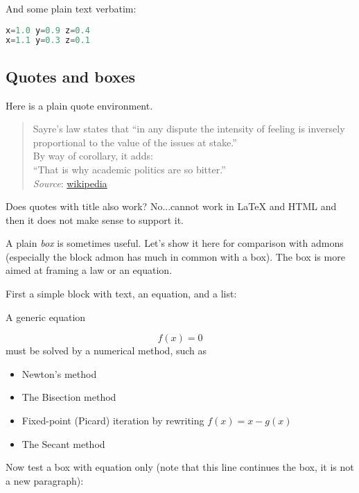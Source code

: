 \documentclass[%
oneside,                 %
final,                   %
10pt]{article}
\begin{document}
And some plain text verbatim:

\begin{lstlisting}[language=Python,style=simple,xleftmargin=2mm]
x=1.0 y=0.9 z=0.4
x=1.1 y=0.3 z=0.1
\end{lstlisting}

\subsection{Quotes and boxes}

Here is a plain quote environment.


\begin{quote}
Sayre's law states that
``in any dispute the intensity of feeling is inversely
proportional to the value of the issues at stake.'' \\
By way of corollary, it adds: \\
``That is why academic politics are so bitter.'' \\
\emph{Source}: \href{{https://en.wikipedia.org/wiki/Sayre's_law}}{wikipedia}
\end{quote}


Does quotes with title also work? No...cannot work in {\LaTeX} and HTML
and then it does not make sense to support it.

A plain \emph{box} is sometimes useful. Let's show it here for comparison
with admons (especially the block admon has much in common with a box).
The box is more aimed at framing a law or an equation.

First a simple block with text, an equation, and a list:


\begin{center}
\begin{Sbox}
\begin{minipage}{0.85\linewidth}
A generic equation

\[ f(x) = 0 \]
must be solved by a numerical method, such as

\begin{itemize}
 \item Newton's method

 \item The Bisection method

 \item Fixed-point (Picard) iteration by rewriting $f(x)=x - g(x)$

 \item The Secant method
\end{itemize}

\noindent
\end{minipage}
\end{Sbox}
\fbox{\TheSbox}
\end{center}
Now test a box with equation only (note that this line continues the
box, it is not a new paragraph):
\end{document}
